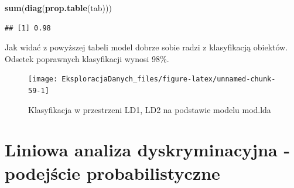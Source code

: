 \documentclass[]{book}
\newenvironment{Shaded}{\begin{snugshade}}{\end{snugshade}}
\newcommand{\DataTypeTok}[1]{\textcolor[rgb]{0.13,0.29,0.53}{#1}}
\newcommand{\KeywordTok}[1]{\textcolor[rgb]{0.13,0.29,0.53}{\textbf{#1}}}
\newcommand{\NormalTok}[1]{#1}
\newcommand{\OperatorTok}[1]{\textcolor[rgb]{0.81,0.36,0.00}{\textbf{#1}}}
\newcommand{\StringTok}[1]{\textcolor[rgb]{0.31,0.60,0.02}{#1}}
\theoremstyle{plain}
\theoremstyle{definition}
\theoremstyle{definition}
\theoremstyle{definition}
\theoremstyle{definition}
\theoremstyle{remark}
\begin{document}
\begin{Shaded}
\begin{Highlighting}[]
\KeywordTok{sum}\NormalTok{(}\KeywordTok{diag}\NormalTok{(}\KeywordTok{prop.table}\NormalTok{(tab)))}
\end{Highlighting}
\end{Shaded}

\begin{verbatim}
## [1] 0.98
\end{verbatim}

Jak widać z powyższej tabeli model dobrze sobie radzi z klasyfikacją obiektów. Odsetek poprawnych klasyfikacji wynosi 98\%.

\begin{Shaded}
\end{Shaded}

\begin{figure}

{\centering \texttt{[image: EksploracjaDanych\_files/figure-latex/unnamed-chunk-59-1]} 

}

\caption{Klasyfikacja w przestrzeni LD1, LD2 na podstawie modelu mod.lda}\label{fig:unnamed-chunk-59}
\end{figure}

\hypertarget{liniowa-analiza-dyskryminacyjna---podejscie-probabilistyczne}{%
\section{Liniowa analiza dyskryminacyjna - podejście probabilistyczne}\label{liniowa-analiza-dyskryminacyjna---podejscie-probabilistyczne}}
\end{document}
